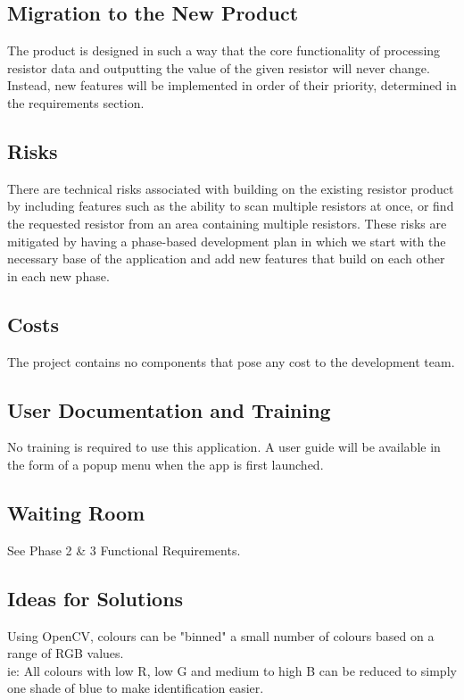 \documentclass{article}
\begin{document}
\subsection{Migration to the New Product}
The product is designed in such a way that the core functionality of processing resistor data and outputting the value of the given resistor will never change. Instead, new features will be implemented in order of their priority, determined in the requirements section.

\subsection{Risks}
There are technical risks associated with building on the existing resistor product by including features such as the ability to scan multiple resistors at once, or find the requested resistor from an area containing multiple resistors. These risks are mitigated by having a phase-based development plan in which we start with the necessary base of the application and add new features that build on each other in each new phase.

\subsection{Costs}
The project contains no components that pose any cost to the development team.

\subsection{User Documentation and Training}
No training is required to use this application. A user guide will be available in the form of a popup menu when the app is first launched.

\subsection{Waiting Room}
See Phase 2 \& 3 Functional Requirements.

\subsection{Ideas for Solutions}
Using OpenCV, colours can be "binned" a small number of colours based on a range of RGB values. \\ 
ie: All colours with low R, low G and medium to high B can be reduced to simply one shade of blue to make identification easier. \\
\end{document}
